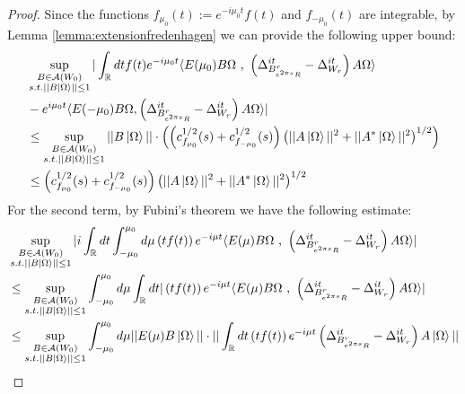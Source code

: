 \documentclass[a4paper,11pt]{article}
\theoremstyle{definition}
\newcommand{\lb}{\left(}
\newcommand{\rb}{\right)}
\begin{document}
\begin{proof}
    Since the functions $f_{\mu_0}(t) := e^{-i\mu_0 t}f(t)$ and $f_{-\mu_0}(t)$ are integrable, by Lemma \ref{lemma:extensionfredenhagen} we can provide the following upper bound:
    \begin{align}
        \begin{split}
            &\sup_{\substack{B\in\mathcal{A}(W_0)\\s.t.||B\ket{\Omega}||\leq 1}}|\int_\mathbb{R} dt f(t) e^{-i\mu_0 t}\langle E(\mu_0)B\Omega\text{ , }\lb\Delta^{it}_{B^r_{e^{2\pi s}R}} - \Delta^{it}_{W_r}\rb A\Omega\rangle \\& - e^{i\mu_0 t}\langle E(-\mu_0)B\Omega, \lb\Delta^{it}_{B^r_{e^{2\pi s}R}} - \Delta^{it}_{W_r}\rb A\Omega\rangle|
            \\&
            \leq \sup_{\substack{B\in\mathcal{A}(W_0)\\s.t.||B\ket{\Omega}||\leq 1}}||B\ket{\Omega}||\cdot\lb \lb c_{f_{\mu_0}}^{1/2}(s) + c_{f_{-\mu_0}}^{1/2}(s)\rb\lb||A\ket{\Omega}||^2 + ||A^*\ket{\Omega}||^2\rb^{1/2}\rb
            \\&
            \leq \lb c_{f_{\mu_0}}^{1/2}(s) + c_{f_{-\mu_0}}^{1/2}(s)\rb\lb||A\ket{\Omega}||^2 + ||A^*\ket{\Omega}||^2\rb^{1/2}
        \end{split}
    \end{align}
    For the second term, by Fubini's theorem we have the following estimate:
    \begin{align}
        \begin{split}
            &\sup_{\substack{B\in\mathcal{A}(W_0)\\s.t.||B\ket{\Omega}||\leq 1}}|i\int_\mathbb{R} dt \int_{-\mu_0}^{\mu_0}d\mu \lb tf(t)\rb e^{-i\mu t}\langle E(\mu)B\Omega\text{ , }\lb\Delta^{it}_{B^r_{e^{2\pi s}R}} - \Delta^{it}_{W_r}\rb A\Omega \rangle|
            \\&
            \leq \sup_{\substack{B\in\mathcal{A}(W_0)\\s.t.||B\ket{\Omega}||\leq 1}}\int_{-\mu_0}^{\mu_0}d\mu\int_\mathbb{R} dt |\lb tf(t)\rb e^{-i\mu t}\langle E(\mu)B\Omega\text{ , }\lb \Delta^{it}_{B^r_{e^{2\pi s}R}} - \Delta^{it}_{W_r} \rb A\Omega \rangle|
            \\&
            \leq \sup_{\substack{B\in\mathcal{A}(W_0)\\s.t.||B\ket{\Omega}||\leq 1}}\int_{-\mu_0}^{\mu_0}d\mu ||E(\mu) B\ket{\Omega}||\cdot||\int_\mathbb{R} dt\lb tf(t) \rb e^{-i\mu t}\lb\Delta^{it}_{B^r_{e^{2\pi s}R}}- \Delta^{it}_{W_r}\rb A\ket{\Omega}||
        \end{split}

\end{align}
\end{proof}
\end{document}

